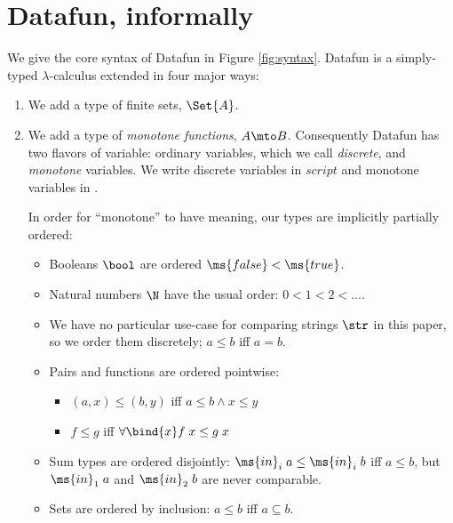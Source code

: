 
\section{Datafun, informally}
\label{sec:informally}

We give the core syntax of Datafun in Figure \ref{fig:syntax}. Datafun is a
simply-typed $\lambda$-calculus extended in four major ways:

\begin{enumerate}
\item We add a type of finite sets, $\Set{A}$.



\item We add a type of \emph{monotone functions}, $A \mto B$. Consequently
  Datafun has two flavors of variable: ordinary variables, which we call
  \emph{discrete}, and \emph{monotone} variables. We write discrete variables in
  $script$ and monotone variables in .

  In order for ``monotone'' to have meaning, our types are implicitly partially
  ordered:
  \begin{itemize}
  \item Booleans $\bool$ are ordered $\ms{false} < \ms{true}$.
  \item Natural numbers $\N$ have the usual order: $0 < 1 < 2 < ...$.
  \item We have no particular use-case for comparing strings $\str$ in
    this paper, so we order them discretely; $a \le b$ iff $a = b$.
  \item Pairs and functions are ordered pointwise:
    \begin{itemize}
    \item $(a, x) \le (b, y)$ iff $a \le b \wedge x \le y$
    \item $f \le g$ iff $\forall \bind{x} f\;x \le g\;x$
    \end{itemize}
  \item Sum types are ordered disjointly: $\ms{in}_i\; a \le
    \ms{in}_i\; b$ iff $a \le b$, but $\ms{in}_1\; a$ and $\ms{in}_2\; b$ are
    never comparable.
  \item Sets are ordered by inclusion: $a \le b$ iff $a \subseteq b$.
  \end{itemize}


\end{enumerate}
